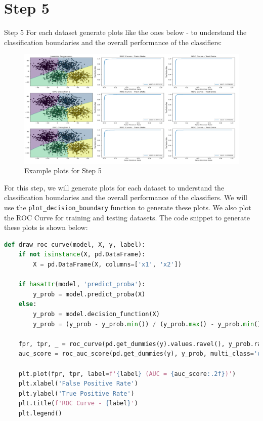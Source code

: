 \section*{Step 5}

\begin{custombox}[label={box:Q5}]{Step 5}
	For each dataset generate plots like the ones below - to understand the classification boundaries and the overall performance of the classifiers: 

    \begin{figure}[H]
        \centering
        \includegraphics[width=\textwidth]{Images/Step-5-example.png}
        \caption{Example plots for Step 5}
    \end{figure}
\end{custombox}

\vspace{10mm}

For this step, we will generate plots for each dataset to understand the classification boundaries and the overall performance of the classifiers. We will use the \texttt{plot\_decision\_boundary} function to generate these plots. We also plot the ROC Curve for training and testing datasets. The code snippet to generate these plots is shown below:

\begin{lstlisting}[language=Python, caption=Function to draw ROC Curve, label={lst:Q5}]
def draw_roc_curve(model, X, y, label):
    if not isinstance(X, pd.DataFrame):
        X = pd.DataFrame(X, columns=['x1', 'x2'])

    if hasattr(model, 'predict_proba'):
        y_prob = model.predict_proba(X)
    else:
        y_prob = model.decision_function(X)
        y_prob = (y_prob - y_prob.min()) / (y_prob.max() - y_prob.min())

    fpr, tpr, _ = roc_curve(pd.get_dummies(y).values.ravel(), y_prob.ravel())
    auc_score = roc_auc_score(pd.get_dummies(y), y_prob, multi_class='ovr')

    plt.plot(fpr, tpr, label=f'{label} (AUC = {auc_score:.2f})')
    plt.xlabel('False Positive Rate')
    plt.ylabel('True Positive Rate')
    plt.title(f'ROC Curve - {label}')
    plt.legend()
\end{lstlisting}

